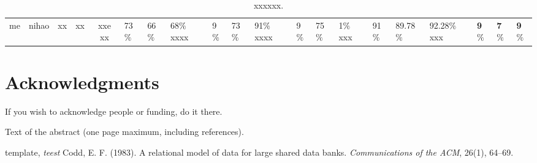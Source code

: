 \documentclass[a4paper, 10pt]{article}
\begin{document}
\begin{table}[!htp] \footnotesize
	\centering
	\fontsize{6.5}{8}\selectfont
	\begin{threeparttable}
		\caption{xxxxxx.}
		\label{1234567}
		\setlength{\tabcolsep}{15mm}
		\begin{tabular}{ccccccc}
			\toprule
			\multirow{2}{*}{me} &
			\multicolumn{3}{c}{nihao}\cr
			\cmidrule(lr){2-4}
			                    & xx         & xx         & xxe\cr
			\midrule
			xx                  & 73$\%$     & 66$\%$     & 68$\%$\cr
			xxxx                & 9$\%$      & 73$\%$     & 91$\%$\cr
			xxxx                & 9$\%$      & 75$\%$     & 1$\%$\cr
			xxx                 & 91$\%$     & 89.78$\%$  & 92.28$\%$\cr
			xxx                 & {\bf9$\%$} & {\bf7$\%$} & {\bf9$\%$}\cr
			\bottomrule
		\end{tabular}
	\end{threeparttable}
\end{table}
















\section*{Acknowledgments}
If you wish to acknowledge people or funding, do it there.

\printbibliography
Text of the abstract (one page maximum, including references).

\begin{thebibliography}{60}
	template,
	\textit{teest}
	 Codd, E. F. (1983). A relational model of data for large shared data banks. \textit{Communications of the ACM}, 26(1), 64--69.

\end{thebibliography}
\end{document}

